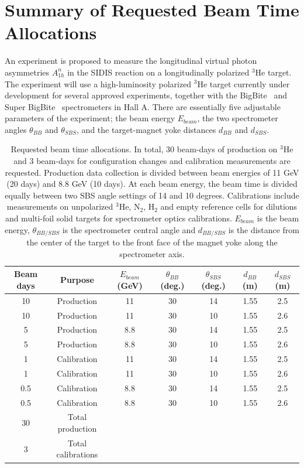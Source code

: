 \section{Summary of Requested Beam Time Allocations}
An experiment is proposed to measure the longitudinal virtual photon asymmetries $A_{1h}^{n}$ in the SIDIS reaction on a longitudinally polarized $^3$He target. The experiment will use a high-luminosity polarized $^3$He target currently under development for several approved experiments, together with the BigBite~\cite{BigBiteOptics1998,BigBite1998,BigBiteOptics2012} and Super BigBite~\cite{SBS_CDR,SBS_CDR_NEW} spectrometers in Hall A. There are essentially five adjustable parameters of the experiment; the beam energy $E_{beam}$, the two spectrometer angles $\theta_{BB}$ and $\theta_{SBS}$, and the target-magnet yoke distances $d_{BB}$ and $d_{SBS}$.
\begin{table}[h]
  \begin{center}
    \caption{\label{Kintable} Requested beam time allocations. In total, 30 beam-days of production on $^3$He and 3 beam-days for configuration changes and calibration measurements are requested. Production data collection is divided between beam energies of 11 GeV (20 days) and 8.8 GeV (10 days). At each beam energy, the beam time is divided equally between two SBS angle settings of 14 and 10 degrees. Calibrations include measurements on unpolarized $^3$He, N$_2$, H$_2$ and empty reference cells for dilutions and multi-foil solid targets for spectrometer optics calibrations. $E_{beam}$ is the beam energy, $\theta_{BB/SBS}$ is the spectrometer central angle and $d_{BB/SBS}$ is the distance from the center of the target to the front face of the magnet yoke along the spectrometer axis.}
    \begin{tabular}{ccccccc}
      \hline \hline Beam days & Purpose & $E_{beam}$ (GeV) & $\theta_{BB}$ (deg.) & $\theta_{SBS}$ (deg.) & $d_{BB}$ (m) & $d_{SBS}$ (m)  \\ \hline 
      10 & Production & 11 & 30 & 14 & 1.55 & 2.5 \\ 
      10 & Production & 11 & 30 & 10 & 1.55 & 2.6 \\
      5 & Production & 8.8 & 30 & 14 & 1.55 & 2.5  \\ 
      5 & Production & 8.8 & 30 & 10 & 1.55 & 2.6  \\
      1 & Calibration & 11 & 30 & 14 & 1.55 & 2.5  \\
      1 & Calibration & 11 & 30 & 10 & 1.55 & 2.6 \\
      0.5 & Calibration & 8.8 & 30 & 14 & 1.55 & 2.5 \\ 
      0.5 & Calibration & 8.8 & 30 & 10 & 1.55 & 2.6  \\ \hline 
      30 & Total production & & & & &  \\ 
      3 & Total calibrations & & & & &  \\ \hline \hline
    \end{tabular}
  \end{center}
\end{table}
